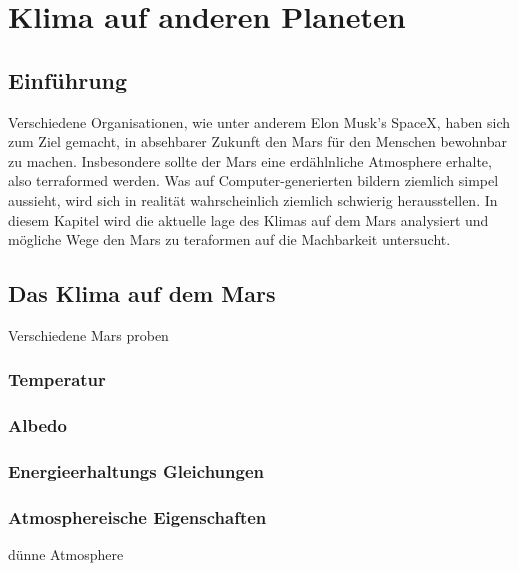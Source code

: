 %
%
%
\chapter{Klima auf anderen Planeten\label{chapter:thema}}
\begin{refsection}

\section{Einführung}

Verschiedene Organisationen, wie unter anderem Elon Musk's SpaceX, haben sich zum Ziel gemacht, in absehbarer Zukunft den Mars für den Menschen bewohnbar zu machen. Insbesondere sollte der Mars eine erdählnliche Atmosphere erhalte, also terraformed werden. Was auf Computer-generierten bildern ziemlich simpel aussieht, wird sich in realität wahrscheinlich ziemlich schwierig herausstellen. In diesem Kapitel wird die aktuelle lage des Klimas auf dem Mars analysiert und mögliche Wege den Mars zu teraformen auf die Machbarkeit untersucht.

\section{Das Klima auf dem Mars}

Verschiedene Mars proben

\subsection{Temperatur}

\subsection{Albedo}


\subsection{Energieerhaltungs Gleichungen}




\subsection{Atmosphereische Eigenschaften}

dünne Atmosphere


\end{refsection}
